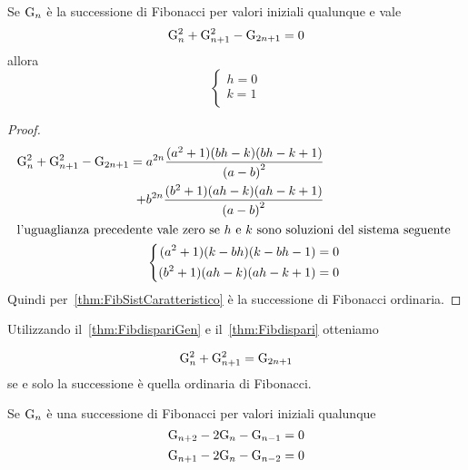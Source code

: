 \begin{thm}[Dispari]\label{thm:FibdispariGen}
	Se $\mathrm{G}_{n}$ è la successione di Fibonacci per valori iniziali qualunque e 
	vale 
	\begin{equation}
		\mathrm{G}_{n}^2+\mathrm{G}_{n+1}^2-\mathrm{G}_{2n+1}=0 
	\end{equation}\label{eqn:FibDispariGen} allora 
\[\begin{cases}
	h=0\\
	k=1\\
\end{cases}\]
\end{thm}
\begin{proof}
\begin{align*}
\mathrm{G}_{n}^2+\mathrm{G}_{n+1}^2-\mathrm{G}_{2n+1}={}&a^{2n}\dfrac{(a^2+1)(bh-k)(bh-k+1)}{\left(a-b\right)^2}\\
+&b^{2n}\dfrac{(b^2+1)(ah-k)(ah-k+1)}{\left(a-b\right)^2}\\
\intertext{l'uguaglianza precedente vale zero se $h$ e $k$ sono soluzioni del 
sistema seguente }
&	\left\{
\begin{aligned}
	(a^2+1)(k-bh)(k-bh-1)=0\\
	(b^2+1)(ah-k)(ah-k+1)=0
\end{aligned}
\right.\\
\end{align*}
Quindi per~\vref{thm:FibSistCaratteristico} è la successione di Fibonacci 
ordinaria.
\end{proof}
Utilizzando il~\vref{thm:FibdispariGen} e il~\vref{thm:Fibdispari} otteniamo
\begin{thm}[Unicità]
	\begin{equation}
		\mathrm{G}_{n}^2+\mathrm{G}_{n+1}^2=\mathrm{G}_{2n+1} 
	\end{equation} se e solo la successione è quella ordinaria di Fibonacci. 
\end{thm}
\begin{thm}[Proprietà]
	Se $\mathrm{G}_{n}$ è una  successione di Fibonacci per valori iniziali qualunque
	\begin{equation}
		\mathrm{G}_{n+2}-2\mathrm{G}_{n}-\mathrm{G}_{n-1}=0 
	\end{equation} 
\begin{equation}
	\mathrm{G}_{n+1}-2\mathrm{G}_{n}-\mathrm{G}_{n-2}=0 
\end{equation} 
\end{thm}~\cite{Horadam_1961}
